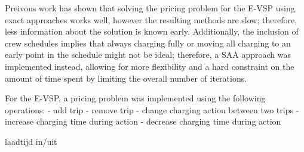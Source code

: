 \documentclass[]{article}
\begin{document}
Preivous work has shown that solving the pricing problem for the E-VSP using exact approaches works well, however the resulting methods are slow; therefore, less information about the solution is known early. Additionally, the inclusion of crew schedules implies that always charging fully or moving all charging to an early point in the schedule might not be ideal; therefore, a SAA approach was implemented instead, allowing for more flexibility and a hard constraint on the amount of time spent by limiting the overall number of iterations. 

For the E-VSP, a pricing problem was implemented using the following operations: 
- add trip
- remove trip
- change charging action between two trips 
- increase charging time during action
- decrease charging time during action

laadtijd in/uit
\printbibliography
\end{document}
